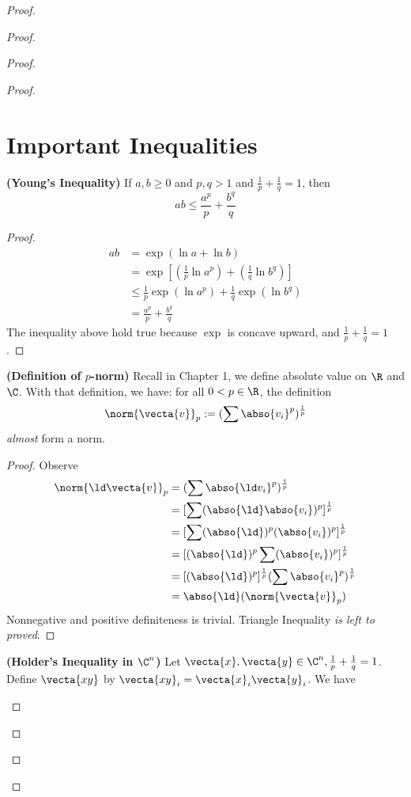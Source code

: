 \documentclass{report}
\begin{document}
\begin{proof}
\begin{proof}
\begin{proof}
\begin{proof}
\section{Important Inequalities}
\begin{theorem}
\label{8.1.1}
\textbf{(Young's Inequality)} If $a,b\geq 0$ and $p,q>1$ and  $\frac{1}{p}+\frac{1}{q}=1$, then
\begin{equation}
ab\leq \frac{a^p}{p}+\frac{b^q}{q}
\end{equation}
\end{theorem}
\begin{proof}
\begin{align}
  ab&=\exp(\ln a+ \ln b)\\
    &=\exp[(\frac{1}{p}\ln a^p)+(\frac{1}{q}\ln b^q)]\\
&\leq \frac{1}{p}\exp(\ln a^p)+\frac{1}{q}\exp(\ln b^q)\\
&= \frac{a^p}{p}+\frac{b^q}{q}
\end{align}
The inequality above hold true because  $\exp$ is concave upward, and $\frac{1}{p}+\frac{1}{q}=1$. 
\end{proof}
\begin{theorem}
\label{8.1.2}
\textbf{(Definition of $p$-norm)} Recall in Chapter 1, we define absolute value on $\R$ and  $\C$. With that definition, we have: for all $0<p \in \R$, the definition
\begin{equation}
  \norm{\vecta{v}}_p:= (\sum \abso{v_i}^p)^{\frac{1}{p}}
\end{equation}
\textit{almost} form a norm.
\end{theorem}
\begin{proof}
Observe 
\begin{align}
\norm{\ld \vecta{v}}_p&=(\sum \abso{\ld v_i}^p)^{\frac{1}{p}} \\
&=[\sum (\abso{\ld }\abso{v_i})^p]^{\frac{1}{p}}\\
&=[\sum (\abso{\ld })^p(\abso{v_i})^p]^{\frac{1}{p}}\\
&=[(\abso{\ld })^p\sum (\abso{v_i})^p]^{\frac{1}{p}}\\
&=[(\abso{\ld })^p]^{\frac{1}{p}}(\sum \abso{v_i}^p)^{\frac{1}{p}}\\
&=\abso{\ld }(\norm{\vecta{v}}_p)
\end{align}
Nonnegative and positive definiteness is trivial. Triangle Inequality \textit{is left to proved}. 
\end{proof}
\begin{theorem}
\label{8.1.3}
\textbf{(Holder's Inequality in $\C^n$)} Let $\vecta{x},\vecta{y}\in \C^n,\frac{1}{p}+\frac{1}{q}=1$. Define $\vecta{xy}$ by $\vecta{xy}_i=\vecta{x}_i\vecta{y}_i$. We have

\end{theorem}
\end{proof}
\end{proof}
\end{proof}
\end{proof}
\end{document}
